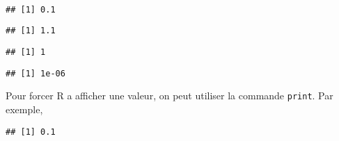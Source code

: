 \begin{knitrout}
\color{fgcolor}\begin{kframe}
\begin{flushleft}
\ttfamily\noindent
{}\hlassignement{\usebox{\hlnormalsizeboxlessthan}-}{\ }\hspace*{\fill}\\
\hlstd{}\hlassignement{\usebox{\hlnormalsizeboxlessthan}-}{\ }\hspace*{\fill}\\
\hlstd{}\hlassignement{\usebox{\hlnormalsizeboxlessthan}-}{\ }\hspace*{\fill}\\
\hlstd{}\mbox{}
\normalfont
\end{flushleft}
\begin{verbatim}
## [1] 0.1
\end{verbatim}
\begin{flushleft}
\ttfamily\noindent
{}\hlkeyword{+}{\ }\mbox{}
\normalfont
\end{flushleft}
\begin{verbatim}
## [1] 1.1
\end{verbatim}
\begin{flushleft}
\ttfamily\noindent
{}\mbox{}
\normalfont
\end{flushleft}
\begin{verbatim}
## [1] 1
\end{verbatim}
\begin{flushleft}
\ttfamily\noindent
{}\mbox{}
\normalfont
\end{flushleft}
\begin{verbatim}
## [1] 1e-06
\end{verbatim}
\end{kframe}
\end{knitrout}


Pour forcer R a afficher une valeur, on peut utiliser la commande \texttt{print}. Par exemple,

\begin{knitrout}
\color{fgcolor}\begin{kframe}
\begin{flushleft}
\ttfamily\noindent
{}\hlkeyword{(}\hlkeyword{)}\mbox{}
\normalfont
\end{flushleft}
\begin{verbatim}
## [1] 0.1
\end{verbatim}
\end{kframe}
\end{knitrout}



